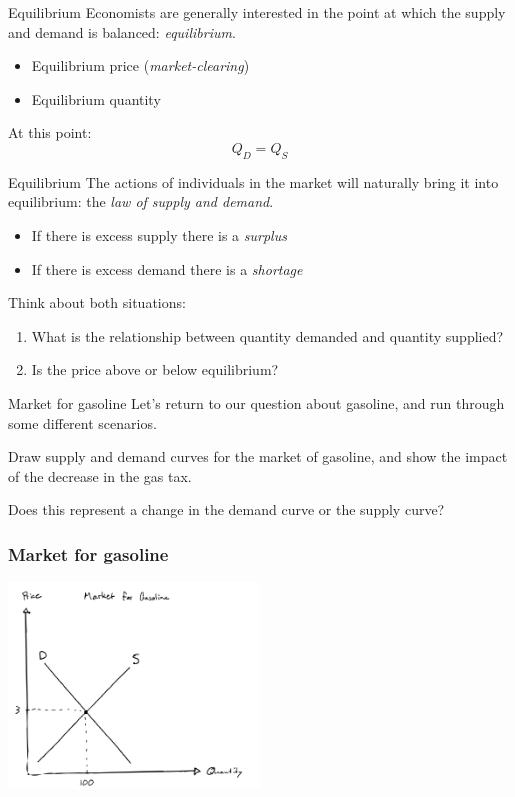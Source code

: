 \documentclass[aspectratio=169]{beamer}
\begin{document}
 \begin{frame}{Equilibrium}
    Economists are generally interested in the point at which the supply and demand is balanced: \textit{equilibrium}.
    \begin{itemize}
        \item Equilibrium price (\textit{market-clearing})
        \item Equilibrium quantity
    \end{itemize}

    At this point:
    $$
    Q_D = Q_S
    $$
\end{frame}

\begin{frame}{Equilibrium}
    The actions of individuals in the market will naturally bring it into equilibrium: the \textit{law of supply and demand}.
    \begin{itemize}
        \item If there is excess supply there is a \textit{surplus}
        \item If there is excess demand there is a \textit{shortage}
    \end{itemize}

    Think about both situations:
    \begin{enumerate}
        \item What is the relationship between quantity demanded and quantity supplied?
        \item Is the price above or below equilibrium?
    \end{enumerate}
\end{frame}

\begin{frame}{Market for gasoline}
    Let's return to our question about gasoline, and run through some different scenarios.

    \medskip

    Draw supply and demand curves for the market of gasoline, and show the impact of the decrease in the gas tax.

    \medskip

    Does this represent a change in the demand curve or the supply curve?
\end{frame}

\begin{frame}
    \frametitle{Market for gasoline}
    \centering
    \includegraphics[width = 0.5\textwidth,keepaspectratio]{market_for_gas.png}
\end{frame}
\end{document}
